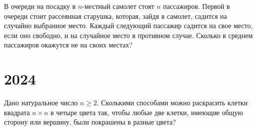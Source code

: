 \documentclass[11pt, a4paper]{problems_template}
\begin{document}
\begin{exercise}[2673]
В очереди на посадку в $n$-местный самолет стоят $n$ пассажиров. Первой в очереди стоит рассеянная старушка, которая, зайдя в самолет, садится на случайно выбранное место. Каждый следующий пассажир садится на свое место, если оно свободно, и на случайное место в противном случае. Сколько в среднем пассажиров окажутся не на своих местах?
\end{exercise}

\chapter{2024}

\begin{exercise}[2810]
Дано натуральное число $n \geqslant 2$. Сколькими способами можно раскрасить клетки квадрата $n \times n$ в четыре цвета так, чтобы любые две клетки, имеющие общую сторону или вершину, были покрашены в
разные цвета?
\end{exercise}
\end{document}
